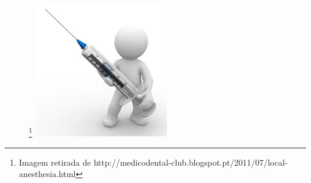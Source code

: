 \documentclass[10pt]{beamer}
\begin{document}
\begin{frame}
\begin{figure}\footnote{Imagem retirada de http://medicodental-club.blogspot.pt/2011/07/local-anesthesia.html}
	\includegraphics[scale=0.5]{F1.png}
\end{figure}
\end{frame}
\end{document}
